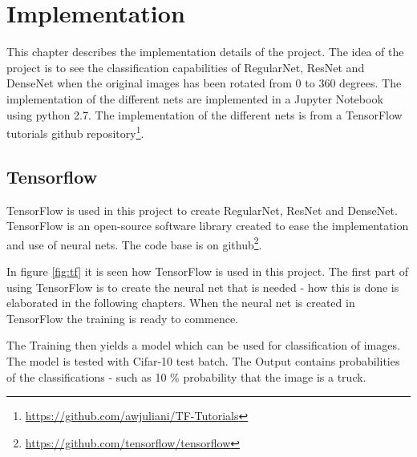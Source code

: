 \chapter{Implementation}
\label{chp:impl}

This chapter describes the implementation details of the project. The idea of the project is to see the classification capabilities of RegularNet, ResNet and DenseNet when the original images has been rotated from 0 to 360 degrees. The implementation of the different nets are implemented in a Jupyter Notebook using python 2.7. The implementation of the different nets is from a TensorFlow tutorials github repository\footnote{\url{https://github.com/awjuliani/TF-Tutorials}}.

\section{Tensorflow}
TensorFlow is used in this project to create RegularNet, ResNet and DenseNet. 
TensorFlow is an open-source software library created to ease the implementation and use of neural nets. The code base is on github\footnote{\url{https://github.com/tensorflow/tensorflow}}.

In figure \ref{fig:tf} it is seen how TensorFlow is used in this project. The first part of using TensorFlow is to create the neural net that is needed - how this is done is elaborated in the following chapters. When the neural net is created in TensorFlow the training is ready to commence. 

The Training then yields a model which can be used for classification of images. The model is tested with Cifar-10 test batch. The Output contains probabilities of the classifications - such as 10 \% probability that the image is a truck.









